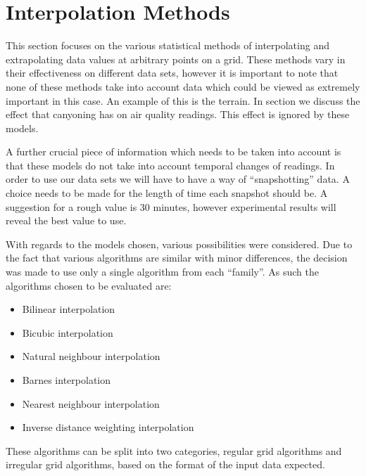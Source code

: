 \section{Interpolation Methods}\label{background_interpolation_methods}
    This section focuses on the various statistical methods of interpolating and extrapolating data values at arbitrary points on a grid. These methods vary in their effectiveness on different data sets, however it is important to note that none of these methods take into account data which could be viewed as extremely important in this case. An example of this is the terrain. In section  we discuss the effect that canyoning has on air quality readings. This effect is ignored by these models. 

    A further crucial piece of information which needs to be taken into account is that these models do not take into account temporal changes of readings. In order to use our data sets we will have to have a way of ``snapshotting'' data. A choice needs to be made for the length of time each snapshot should be. A suggestion for a rough value is 30 minutes, however experimental results will reveal the best value to use.

    With regards to the models chosen, various possibilities were considered. Due to the fact that various algorithms are similar with minor differences, the decision was made to use only a single algorithm from each ``family''. As such the algorithms chosen to be evaluated are:

    \begin{itemize}
        \item Bilinear interpolation
        \item Bicubic interpolation
        \item Natural neighbour interpolation
        \item Barnes interpolation
        \item Nearest neighbour interpolation
        \item Inverse distance weighting interpolation
    \end{itemize}

    These algorithms can be split into two categories, regular grid algorithms and irregular grid algorithms, based on the format of the input data expected. 


